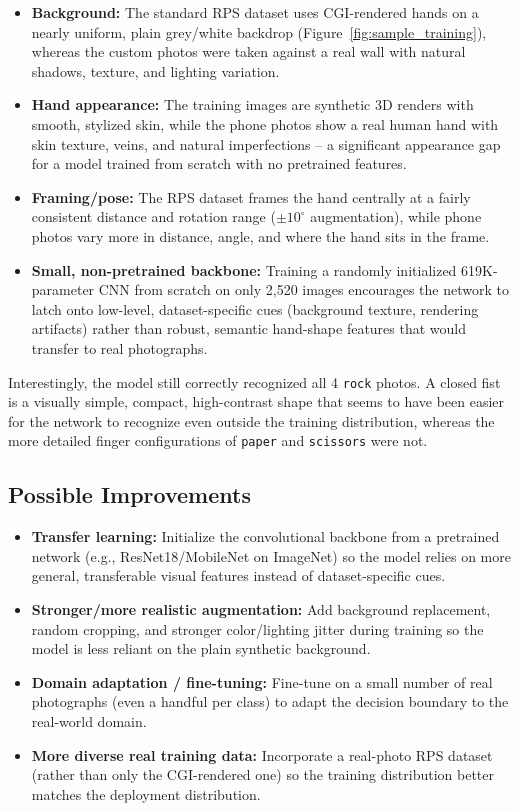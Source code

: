 \documentclass[11pt,a4paper]{article}
\begin{document}
\begin{itemize}[leftmargin=1.3cm]
    \item \textbf{Background:} The standard RPS dataset uses CGI-rendered hands on a nearly uniform, plain grey/white backdrop (Figure~\ref{fig:sample_training}), whereas the custom photos were taken against a real wall with natural shadows, texture, and lighting variation.
    \item \textbf{Hand appearance:} The training images are synthetic 3D renders with smooth, stylized skin, while the phone photos show a real human hand with skin texture, veins, and natural imperfections -- a significant appearance gap for a model trained from scratch with no pretrained features.
    \item \textbf{Framing/pose:} The RPS dataset frames the hand centrally at a fairly consistent distance and rotation range ($\pm10^{\circ}$ augmentation), while phone photos vary more in distance, angle, and where the hand sits in the frame.
    \item \textbf{Small, non-pretrained backbone:} Training a randomly initialized 619K-parameter CNN from scratch on only 2,520 images encourages the network to latch onto low-level, dataset-specific cues (background texture, rendering artifacts) rather than robust, semantic hand-shape features that would transfer to real photographs.
\end{itemize}

Interestingly, the model still correctly recognized all 4 \texttt{rock} photos. A closed fist is a visually simple, compact, high-contrast shape that seems to have been easier for the network to recognize even outside the training distribution, whereas the more detailed finger configurations of \texttt{paper} and \texttt{scissors} were not.

\subsection{Possible Improvements}
\begin{itemize}[leftmargin=1.3cm]
    \item \textbf{Transfer learning:} Initialize the convolutional backbone from a pretrained network (e.g., ResNet18/MobileNet on ImageNet) so the model relies on more general, transferable visual features instead of dataset-specific cues.
    \item \textbf{Stronger/more realistic augmentation:} Add background replacement, random cropping, and stronger color/lighting jitter during training so the model is less reliant on the plain synthetic background.
    \item \textbf{Domain adaptation / fine-tuning:} Fine-tune on a small number of real photographs (even a handful per class) to adapt the decision boundary to the real-world domain.
    \item \textbf{More diverse real training data:} Incorporate a real-photo RPS dataset (rather than only the CGI-rendered one) so the training distribution better matches the deployment distribution.
\end{itemize}
\end{document}
